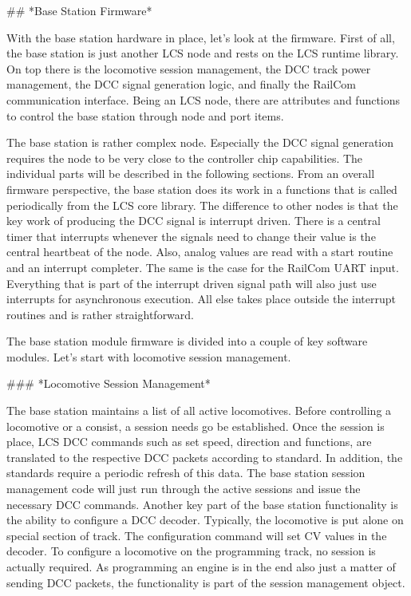 ## *Base Station Firmware*

With the base station hardware in place, let's look at the firmware. First of all, the base station is just another LCS node and rests on the LCS runtime library. On top there is the locomotive session management, the DCC track power management, the DCC signal generation logic, and finally the RailCom communication interface. Being an LCS node, there are attributes and functions to control the base station through node and port items.

The base station is rather complex node. Especially the DCC signal generation requires the node to be very close to the controller chip capabilities. The individual parts will be described in the following sections. From an overall firmware perspective, the base station does its work in a functions that is called periodically from the LCS core library. The difference to other nodes is that the key work of producing the DCC signal is interrupt driven. There is a central timer that interrupts whenever the signals need to change their value is the central heartbeat of the node. Also, analog values are read with a start routine and an interrupt completer. The same is the case for the RailCom UART input. Everything that is part of the interrupt driven signal path will also just use interrupts for asynchronous execution. All else takes place outside the interrupt routines and is rather straightforward.

The base station module firmware is divided into a couple of key software modules. Let's start with locomotive session management.

### *Locomotive Session Management*

The base station maintains a list of all active locomotives. Before controlling a locomotive or a consist, a session needs go be established. Once the session is place, LCS DCC commands such as set speed, direction and functions, are translated to the respective DCC packets according to standard. In addition, the standards require a periodic refresh of this data. The base station session management code will just run through the active sessions and issue the necessary DCC commands. Another key part of the base station functionality is the ability to configure a DCC decoder. Typically, the locomotive is put alone on special section of track. The configuration command will set CV values in the decoder. To configure a locomotive on the programming track, no session is actually required. As programming an engine is in the end also just a matter of sending DCC packets, the functionality is part of the session management object.

